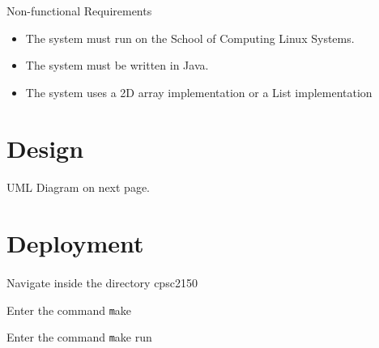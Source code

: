 \documentclass{article}
\begin{document}
Non-functional Requirements
\begin{itemize}
\item The system must run on the School of Computing Linux Systems.
\item The system must be written in Java.
\item The system uses a 2D array implementation or a List implementation 
\end{itemize}  

\section{Design}
\paragraph{}
UML Diagram on next page.  


\section{Deployment}
\paragraph{}
Navigate inside the directory cpsc2150 

Enter the command \texttt make

Enter the command \texttt make run
\end{document}
